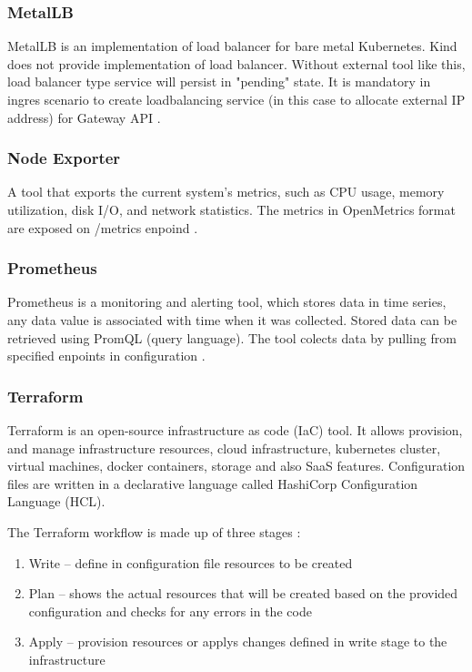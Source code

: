 \subsubsection{MetalLB}
\label{sec:metallb}

MetalLB is an implementation of load balancer for bare metal Kubernetes. Kind does not provide implementation of load balancer. Without external tool like this, load balancer type service will persist in "pending" state. It is mandatory in ingres scenario to create loadbalancing service (in this case to allocate external IP address) for Gateway API \cite{MetalLB}.

\subsubsection{Node Exporter}
\label{sec:nodeExporter}

A tool that exports the current system's metrics, such as CPU usage, memory utilization, disk I/O, and network statistics. The metrics in OpenMetrics format are exposed on /metrics enpoind \cite{NodeExporter}.

\subsubsection{Prometheus}
\label{sec:prometheus}

Prometheus is a monitoring and alerting tool, which stores data in time series, any data value is associated with time when it was collected. Stored data can be retrieved using PromQL (query language). The tool colects data by pulling from specified enpoints in configuration \cite{Prometheus}. 

\subsubsection{Terraform}
\label{sec:terraform}

Terraform is an open-source infrastructure as code (IaC) tool. It allows provision, and manage infrastructure resources, cloud infrastructure, kubernetes cluster, virtual machines, docker containers, storage and also SaaS features. Configuration files are written in a declarative language called HashiCorp Configuration Language (HCL).

The Terraform workflow is made up of three stages \cite{Terraform}:
\begin{enumerate}
  \item Write -- define in configuration file resources to be created
  \item Plan -- shows the actual resources that will be created based on the provided configuration and checks for any errors in the code
  \item Apply -- provision resources or applys changes defined in write stage to the infrastructure 
\end{enumerate}




